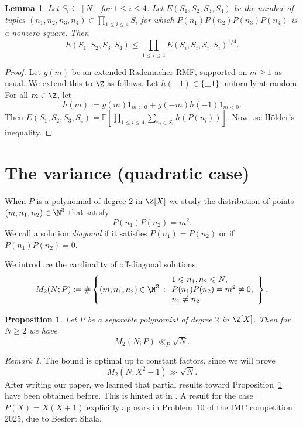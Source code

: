\documentclass[reqno, 12pt]{amsart}
\theoremstyle{plain}
\newtheorem{proposition}[theorem]{Proposition}
\newtheorem{lemma}[theorem]{Lemma}
\theoremstyle{definition}
\theoremstyle{remark}
\newtheorem*{remark}{Remark}
\renewcommand{\le}{\leqslant}
\renewcommand{\ge}{\geqslant}
\renewcommand{\leq}{\leqslant}
\renewcommand{\geq}{\geqslant}
\begin{document}
\begin{lemma}
\label{mixed-4-correlation}
Let $S_i \subseteq [N]$ for $1\le i\le 4$.
Let $E(S_1,S_2,S_3,S_4)$ be the number of tuples
$(n_1,n_2,n_3,n_4)\in \prod_{1\le i\le 4} S_i$
for which $P(n_1)P(n_2)P(n_3)P(n_4)$ is a nonzero square.
Then
$$E(S_1,S_2,S_3,S_4) \le \prod_{1\le i\le 4} E(S_i,S_i,S_i,S_i)^{1/4}.$$
\end{lemma}

\begin{proof}
Let $g(m)$ be an extended Rademacher RMF, supported on $m\ge 1$ as usual.
We extend this to $\Z$ as follows.
Let $h(-1)\in \{\pm 1\}$ uniformly at random.
For all $m\in \Z$, let $$h(m) := g(m) 1_{m>0} + g(-m) h(-1) 1_{m<0}.$$
Then $E(S_1,S_2,S_3,S_4) = \mathbb{E}[\prod_{1\le i\le 4} \sum_{n_i\in S_i} h(P(n_i))]$.
Now use H\"{o}lder's inequality.
\end{proof}

\section{The variance (quadratic case)}

When $P$ is a polynomial of degree $2$ in $\Z[X]$ we study the distribution of points $(m,n_1,n_2)\in \N^3$ that satisfy 
\begin{equation}
    \label{be a square}
P(n_1)P(n_2)=m^2.\end{equation}
We call a solution  {\it diagonal} if it satisfies $P(n_1)=P(n_2)$ or if $P(n_1)P(n_2)=0$.

We introduce the cardinality of off-diagonal solutions
$$M_2(N;P):=\#\left\{ (m,n_1,n_2)\in \N^3\,: \begin{array}{l} 1\leq n_1,n_2\leq N,\\ P(n_1)P(n_2)=m^2\neq 0,\\  n_1 \neq  n_2 \end{array}\right\}.$$


 \begin{proposition}\label{prop N2}
Let $P$ be a separable polynomial of degree $2$ in $\Z[X]$. Then for $N\geq 2$
we have
$$M_2(N;P)\ll_P \sqrt{N}
.$$
     \end{proposition} 

\begin{remark}
  The bound is   optimal up to constant factors,
  since we will prove\begin{equation}
        \label{eq optimal}
        M_2(N;X^2-1)\gg \sqrt{N}.
    \end{equation}
    After writing our paper,
    we learned that partial results toward
    Proposition~\ref{prop N2} have been obtained before.
    This is hinted at in \cite[\S1.4]{CS25}.
    A result for the case $P(X) = X(X+1)$ explicitly appears in
    Problem~10 of the IMC competition 2025,
    due to Besfort Shala.
\end{remark}
\end{document}
